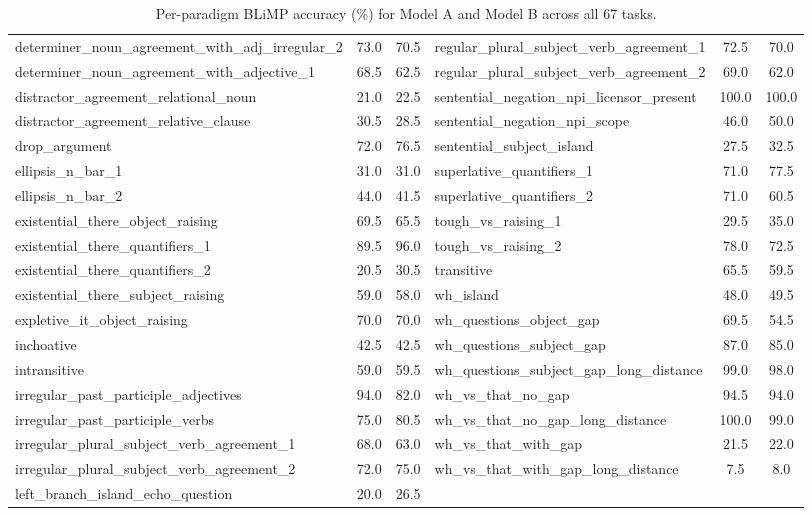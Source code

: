 \documentclass[11pt]{article}
\begin{document}
\begin{table}[t]
\begin{tabular}{lcc|lcc}
determiner\_noun\_agreement\_with\_adj\_irregular\_2 & 73.0 & 70.5 & regular\_plural\_subject\_verb\_agreement\_1 & 72.5 & 70.0 \\
determiner\_noun\_agreement\_with\_adjective\_1 & 68.5 & 62.5 & regular\_plural\_subject\_verb\_agreement\_2 & 69.0 & 62.0 \\
distractor\_agreement\_relational\_noun & 21.0 & 22.5 & sentential\_negation\_npi\_licensor\_present & 100.0 & 100.0 \\
distractor\_agreement\_relative\_clause & 30.5 & 28.5 & sentential\_negation\_npi\_scope & 46.0 & 50.0 \\
drop\_argument & 72.0 & 76.5 & sentential\_subject\_island & 27.5 & 32.5 \\
ellipsis\_n\_bar\_1 & 31.0 & 31.0 & superlative\_quantifiers\_1 & 71.0 & 77.5 \\
ellipsis\_n\_bar\_2 & 44.0 & 41.5 & superlative\_quantifiers\_2 & 71.0 & 60.5 \\
existential\_there\_object\_raising & 69.5 & 65.5 & tough\_vs\_raising\_1 & 29.5 & 35.0 \\
existential\_there\_quantifiers\_1 & 89.5 & 96.0 & tough\_vs\_raising\_2 & 78.0 & 72.5 \\
existential\_there\_quantifiers\_2 & 20.5 & 30.5 & transitive & 65.5 & 59.5 \\
existential\_there\_subject\_raising & 59.0 & 58.0 & wh\_island & 48.0 & 49.5 \\
expletive\_it\_object\_raising & 70.0 & 70.0 & wh\_questions\_object\_gap & 69.5 & 54.5 \\
inchoative & 42.5 & 42.5 & wh\_questions\_subject\_gap & 87.0 & 85.0 \\
intransitive & 59.0 & 59.5 & wh\_questions\_subject\_gap\_long\_distance & 99.0 & 98.0 \\
irregular\_past\_participle\_adjectives & 94.0 & 82.0 & wh\_vs\_that\_no\_gap & 94.5 & 94.0 \\
irregular\_past\_participle\_verbs & 75.0 & 80.5 & wh\_vs\_that\_no\_gap\_long\_distance & 100.0 & 99.0 \\
irregular\_plural\_subject\_verb\_agreement\_1 & 68.0 & 63.0 & wh\_vs\_that\_with\_gap & 21.5 & 22.0 \\
irregular\_plural\_subject\_verb\_agreement\_2 & 72.0 & 75.0 & wh\_vs\_that\_with\_gap\_long\_distance & 7.5 & 8.0 \\
left\_branch\_island\_echo\_question & 20.0 & 26.5 & & & \\
\bottomrule
\end{tabular}
\caption{Per-paradigm BLiMP accuracy (\%) for Model A and Model B across all 67 tasks.}
\label{tab:blimp-full}
\end{table}
\end{document}
